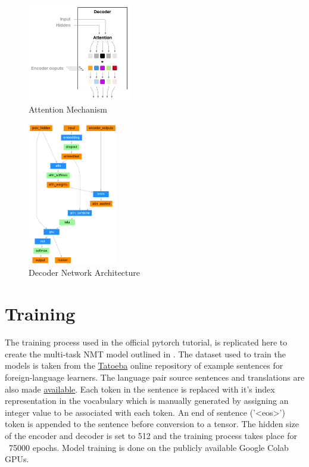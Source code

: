 \documentclass{sigchi}
\begin{document}
\begin{figure}[t]
\centering
\includegraphics[width=0.4\textwidth]{figures/attention.png}
\caption{Attention Mechanism}
\label{fig:attention}
\end{figure}

\begin{figure}[t]
\centering
\includegraphics[width=0.35\textwidth]{figures/decoder-network.png}
\caption{Decoder Network Architecture}
\label{fig:decoder}
\end{figure}



\section{Training}
\par The training process used in the official pytorch tutorial, \cite{seq2seqtorch} is replicated here to create the multi-task NMT model outlined in \cite{lowresourcenmtasian}. The dataset used to train the models is taken from the \href{https://en.wikipedia.org/wiki/Tatoeba}{Tatoeba} online repository of example sentences for foreign-language learners. The language pair source sentences and translations are also made \href{https://www.manythings.org/anki/}{available}. Each token in the sentence is replaced with it's index representation in the vocabulary which is manually generated by assigning an integer value to be associated with each token. An end of sentence ('<eos>') token is appended to the sentence before conversion to a tensor. The hidden size of the encoder and decoder is set to 512 and the training process takes place for ~75000 epochs. Model training is done on the publicly available Google Colab GPUs.
\end{document}
